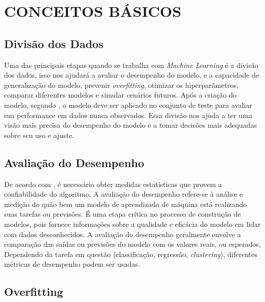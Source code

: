 \documentclass[12pt,oneside,a4paper,chapter=TITLE,
			   english,brazil]{abntex2}
\begin{document}
 \vspace{\onelineskip}


\section{CONCEITOS BÁSICOS}
\subsection{Divisão dos Dados}

Uma das principais  etapas quando se trabalha com \textit{Machine Learning} é a divisão dos dados, isso  nos ajudará a avaliar o desempenho do modelo, e a capacidade de generalização do modelo, prevenir \textit{overfitting}, otimizar os hiperparâmetros, comparar diferentes modelos e simular cenários futuros.   Após a criação do modelo, segundo , o modelo deve ser aplicado no conjunto de teste para avaliar sua
performance em dados nunca observados.  Essa divisão nos ajuda a ter uma visão mais precisa do desempenho do modelo e a tomar decisões mais adequadas sobre seu uso e ajuste.  

\subsection{Avaliação do Desempenho}
De acordo com , é necessário obter medidas estatísticas que provem a confiabilidade do algoritmo.  A avaliação do desempenho refere-se à análise e medição do quão bem um modelo de aprendizado de máquina está realizando suas tarefas ou previsões. É uma etapa crítica no processo de construção de modelos, pois fornece informações sobre a qualidade e eficácia do modelo em lidar com dados desconhecidos.  A avaliação do desempenho geralmente envolve a comparação das saídas ou previsões do modelo com os valores reais, ou esperados, Dependendo da tarefa em questão (classificação, regressão, \textit{clustering}), diferentes métricas de desempenho podem ser usadas.


\subsection{Overfitting}
\end{document}
